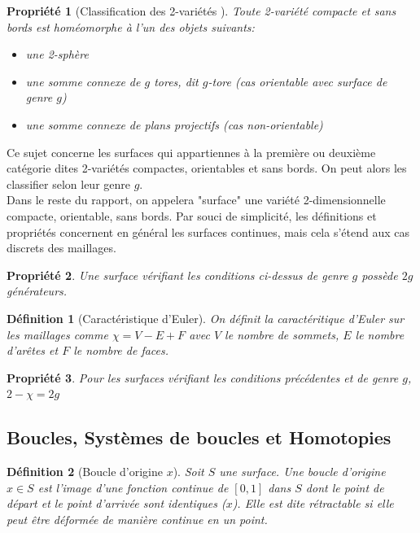 \documentclass[french]{article}
\newtheorem{prop}{Propriété}[section]
\newtheorem{Def}{Définition}[section]
\begin{document}
\begin{prop}[Classification des 2-variétés \cite{class_surfaces}]
    Toute 2-variété compacte et sans bords est homéomorphe à l'un des objets suivants:
    \begin{itemize}
        \item une 2-sphère
        \item une somme connexe de $g$ tores, dit $g$-tore (cas orientable avec surface de genre $g$)
        \item une somme connexe de plans projectifs (cas non-orientable)
    \end{itemize}
\end{prop}

Ce sujet concerne les surfaces qui appartiennes à la première ou deuxième catégorie
dites 2-variétés compactes, orientables et sans bords.
On peut alors les classifier selon leur genre $g$. \\
Dans le reste du rapport, on appelera "surface" une variété 2-dimensionnelle compacte, orientable, sans bords. 
Par souci de simplicité, les définitions et propriétés concernent en général les surfaces continues, 
mais cela s'étend aux cas discrets des maillages.

\begin{prop}
    Une surface vérifiant les conditions ci-dessus de genre $g$ possède $2g$ générateurs.
\end{prop}

\begin{Def}[Caractéristique d'Euler]
    On définit la caractéritique d'Euler sur les maillages comme $\chi = V-E+F$ avec $V$ le nombre de sommets, $E$ le nombre d'arêtes et $F$ le nombre de faces.
\end{Def}

\begin{prop}
    Pour les surfaces vérifiant les conditions précédentes et de genre $g$, $2-\chi = 2g$ 
\end{prop}

\subsection{Boucles, Systèmes de boucles et Homotopies}

\begin{Def}[Boucle d'origine $x$]
Soit $S$ une surface. Une boucle d'origine $x \in S$ est l'image d'une fonction continue de $[0,1]$ dans $S$ 
dont le point de départ et le point d'arrivée sont identiques ($x$). 
Elle est dite rétractable si elle peut être déformée de manière continue en un point.
\end{Def}
\end{document}
